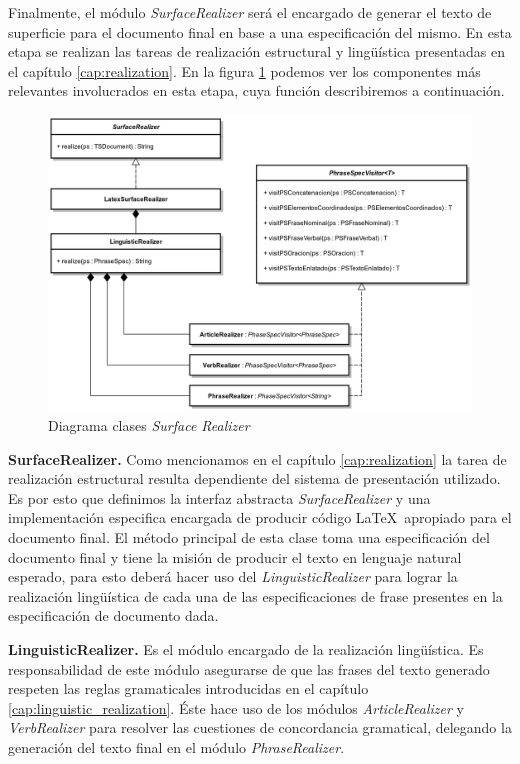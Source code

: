 Finalmente, el módulo \emph{SurfaceRealizer} será el encargado de generar el texto de superficie para el documento final en base a una especificación del mismo. En esta etapa se realizan las tareas de realización estructural y lingüística presentadas en el capítulo \ref{cap:realization}. En la figura \ref{fig:imp_surfrealizer} podemos ver los componentes más relevantes involucrados en esta etapa, cuya función describiremos a continuación. 

\begin{figure}[H]
  	\centering
	\includegraphics[scale=0.17]{img/realizer_imp.png}
	\caption{Diagrama clases \textit{Surface Realizer}}
  	\label{fig:imp_surfrealizer}
\end{figure}

\bigskip
\noindent
\textbf{SurfaceRealizer.} Como mencionamos en el capítulo \ref{cap:realization} la tarea de realización estructural resulta dependiente del sistema de presentación utilizado. Es por esto que definimos la interfaz abstracta \textit{SurfaceRealizer} y una implementación especifica encargada de producir código \LaTeX~apropiado para el documento final. El método principal de esta clase toma una especificación del documento final y tiene la misión de producir el texto en lenguaje natural esperado, para esto deberá hacer uso del \textit{LinguisticRealizer} para lograr la realización lingüística de cada una de las especificaciones de frase presentes en la especificación de documento dada. 


\bigskip
\noindent
\textbf{LinguisticRealizer.} Es el módulo encargado de la realización lingüística. Es responsabilidad de este módulo asegurarse de que las frases del texto generado respeten las reglas gramaticales introducidas en el capítulo \ref{cap:linguistic_realization}. Éste hace uso de los módulos \textit{ArticleRealizer} y \textit{VerbRealizer} para resolver las cuestiones de concordancia gramatical, delegando la generación del texto final en el módulo \textit{PhraseRealizer}. 

